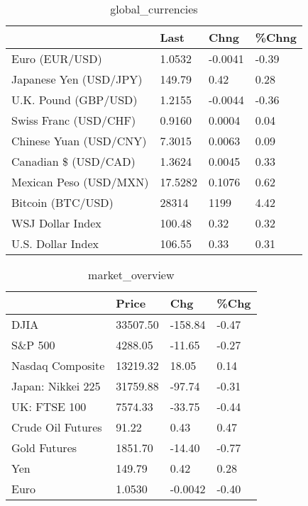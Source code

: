 \documentclass{article}%
\begin{document}
%


\begin{table}[htbp]%
\caption{global\_currencies}%
\centering%
\begin{adjustbox}{width=1\textwidth}%
\begin{tabular}{llll}
\toprule
                       &    Last &    Chng & \%Chng \\
\midrule
        Euro (EUR/USD) &  1.0532 & -0.0041 & -0.39 \\
Japanese Yen (USD/JPY) &  149.79 &    0.42 &  0.28 \\
  U.K. Pound (GBP/USD) &  1.2155 & -0.0044 & -0.36 \\
 Swiss Franc (USD/CHF) &  0.9160 &  0.0004 &  0.04 \\
Chinese Yuan (USD/CNY) &  7.3015 &  0.0063 &  0.09 \\
  Canadian \$ (USD/CAD) &  1.3624 &  0.0045 &  0.33 \\
Mexican Peso (USD/MXN) & 17.5282 &  0.1076 &  0.62 \\
     Bitcoin (BTC/USD) &   28314 &    1199 &  4.42 \\
      WSJ Dollar Index &  100.48 &    0.32 &  0.32 \\
     U.S. Dollar Index &  106.55 &    0.33 &  0.31 \\
\bottomrule
\end{tabular}
%
\end{adjustbox}%
\end{table}

%


\begin{table}[htbp]%
\caption{market\_overview}%
\centering%
\begin{adjustbox}{width=1\textwidth}%
\begin{tabular}{llll}
\toprule
                  &    Price &     Chg &  \%Chg \\
\midrule
             DJIA & 33507.50 & -158.84 & -0.47 \\
          S\&P 500 &  4288.05 &  -11.65 & -0.27 \\
 Nasdaq Composite & 13219.32 &   18.05 &  0.14 \\
Japan: Nikkei 225 & 31759.88 &  -97.74 & -0.31 \\
     UK: FTSE 100 &  7574.33 &  -33.75 & -0.44 \\
Crude Oil Futures &    91.22 &    0.43 &  0.47 \\
     Gold Futures &  1851.70 &  -14.40 & -0.77 \\
              Yen &   149.79 &    0.42 &  0.28 \\
             Euro &   1.0530 & -0.0042 & -0.40 \\
\bottomrule
\end{tabular}
%
\end{adjustbox}%
\end{table}

%
\end{document}
